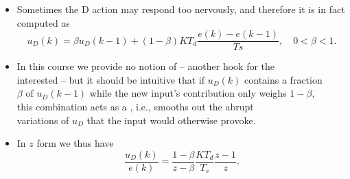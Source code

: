 \begin{frame}
\framesubtitleTC{}
\myPause
 \begin{itemize}[<+-| alert@+>]
 \item Sometimes the D action may respond too nervously, and therefore it is in fact computed as
       \begin{displaymath}
        u_D(k) = \beta u_D(k-1) + (1-\beta) K T_d \frac{e(k)-e(k-1)}{Ts}, \quad 0 < \beta < 1.
       \end{displaymath}
 \item In this course we provide no notion of  -- another hook for the\\
       interested -- but it should be intuitive that if $u_D(k)$ contains a fraction\\
       $\beta$ of $u_D(k-1)$ while the new input's contribution only weighs $1-\beta$,\\
       this combination acts as a , i.e., smooths out the abrupt\\
       variations of $u_D$ that the input would otherwise provoke.
 \item In $z$ form we thus have
       \begin{displaymath}
        \frac{u_D(k)}{e(k)} = \frac{1-\beta}{z-\beta} \frac{K T_d}{T_s} \frac{z-1}{z}.
       \end{displaymath}
 \end{itemize}
\end{frame}

